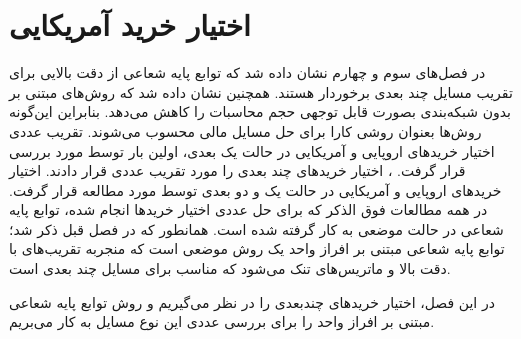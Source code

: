 \chapter{
اختیار خرید آمریکایی 
}
\label{se:option}
%
در فصل‌های سوم و چهارم نشان داده شد که توابع پایه شعاعی از دقت بالایی برای تقریب مسایل چند بعدی برخوردار هستند. همچنین نشان داده شد که روش‌های مبتنی بر بدون شبکه‌بندی بصورت قابل توجهی حجم محاسبات را کاهش می‌دهد. بنابراین این‌گونه روش‌ها بعنوان روشی کارا برای حل مسایل مالی محسوب می‌شوند. تقریب عددی اختیار خریدهای اروپایی و آمریکایی در حالت یک بعدی، اولین بار توسط 
\citep{Hon,McLain}
مورد بررسی قرار گرفت. 
\citep{Pettersson}،
اختیار خریدهای چند بعدی را مورد تقریب عددی قرار دادند. اختیار خرید‌های اروپایی و آمریکایی در حالت یک و دو بعدی توسط 
\citep{Fasshauer}
مورد مطالعه قرار گرفت. در همه مطالعات فوق الذکر که برای حل عددی اختیار خریدها انجام شده، توابع پایه شعاعی در حالت موضعی به کار گرفته شده است. همانطور که در فصل قبل ذکر شد؛ توابع پایه شعاعی مبتنی بر افراز واحد یک روش موضعی است که منجربه تقریب‌های با دقت بالا و ماتریس‌های تنک می‌شود که مناسب برای مسایل چند بعدی است.

در این فصل، اختیار خریدهای چندبعدی را در نظر می‌گیریم و روش توابع پایه شعاعی مبتنی بر افراز واحد را برای بررسی عددی این نوع مسایل به کار می‌بریم.

